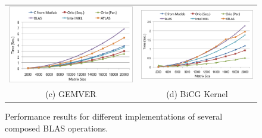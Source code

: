 \documentclass[runningheads]{llncs}
\begin{document}
\begin{figure}[htp]
{\begin{tabular}{cc}
\begin{minipage}[b]{.5\textwidth}
\includegraphics[width=\textwidth]{figures/gemver.png}
\end{minipage}
&
\begin{minipage}[b]{.5\textwidth}
\includegraphics[width=\textwidth]{figures/bicgkernel.png}
\end{minipage}\\

(c) GEMVER & (d) BiCG Kernel \\

\end{tabular}
}
\vspace{-.1in}
\caption{Performance results for different implementations of several composed BLAS operations.}
\label{fig:results}
\vspace{-.2in}
\end{figure}
\end{document}
